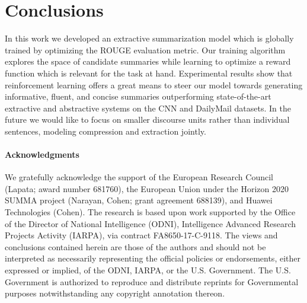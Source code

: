 \documentclass[11pt,a4paper]{article}
\begin{document}
\section{Conclusions}
\label{sec:conclusions}

In this work we developed an extractive summarization model which is
globally trained by optimizing the ROUGE evaluation metric. Our
training algorithm explores the space of candidate summaries while
learning to optimize a reward function which is relevant for the task
at hand. Experimental results show that reinforcement learning offers
a great means to steer our model towards generating informative,
fluent, and concise summaries outperforming state-of-the-art
extractive and abstractive systems on the CNN and DailyMail
datasets. In the future we would like to focus on smaller discourse
units \cite{rst} rather than individual sentences, modeling
compression and extraction
jointly. 

\paragraph{Acknowledgments} \begin{footnotesize} We gratefully
  acknowledge the support of the European Research Council (Lapata;
  award number 681760), the European Union under the Horizon 2020
  SUMMA project (Narayan, Cohen; grant agreement 688139), and Huawei
  Technologies (Cohen).  The research is based upon work supported by
  the Office of the Director of National Intelligence (ODNI),
  Intelligence Advanced Research Projects Activity (IARPA), via
  contract FA8650-17-C-9118.  The views and conclusions contained
  herein are those of the authors and should not be interpreted as
  necessarily representing the official policies or endorsements,
  either expressed or implied, of the ODNI, IARPA, or the
  U.S. Government. The U.S. Government is authorized to reproduce and
  distribute reprints for Governmental purposes notwithstanding any
  copyright annotation thereon.\end{footnotesize}



 
\end{document}
